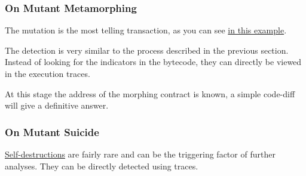 \subsubsection{On Mutant Metamorphing}

The mutation is the most telling transaction, as you can see \href{\urltxmetamorphismsteptwo}{in this example}.

The detection is very similar to the process described in the previous section.
Instead of looking for the indicators in the bytecode, they can directly be viewed in the execution traces.

At this stage the address of the morphing contract is known, a simple code-diff will give a definitive answer.



\subsubsection{On Mutant Suicide}

\href{\urltxmetamorphismstepthree}{Self-destructions} are fairly rare and can be the triggering factor of further analyses.
They can be directly detected using traces.
